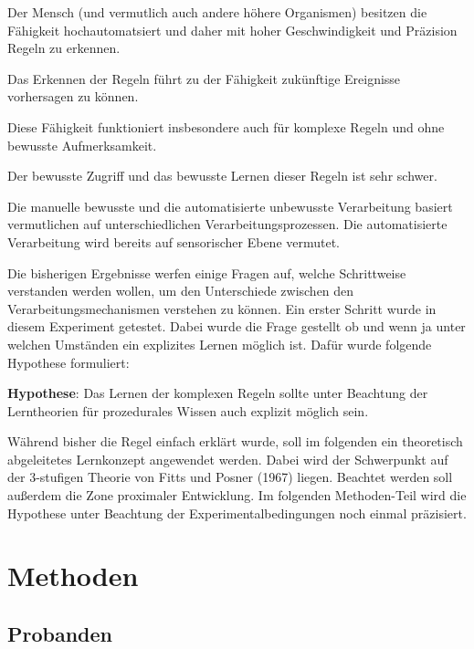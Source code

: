 \documentclass[doc,a4paper,12pt]{apa6}
\begin{document}
\begin{compactitem}
\item Der Mensch (und vermutlich auch andere höhere Organismen) besitzen die Fähigkeit hochautomatsiert und daher mit hoher Geschwindigkeit und Präzision Regeln zu erkennen.
\item Das Erkennen der Regeln führt zu der Fähigkeit zukünftige Ereignisse vorhersagen zu können.
\item Diese Fähigkeit funktioniert insbesondere auch für komplexe Regeln und ohne bewusste Aufmerksamkeit.
\item Der bewusste Zugriff und das bewusste Lernen dieser Regeln ist sehr schwer.
\item Die manuelle bewusste und die automatisierte unbewusste Verarbeitung basiert vermutlichen auf unterschiedlichen Verarbeitungsprozessen. Die automatisierte Verarbeitung wird bereits auf sensorischer Ebene vermutet.
\end{compactitem}

Die bisherigen Ergebnisse werfen einige Fragen auf, welche Schrittweise verstanden werden wollen, um den Unterschiede zwischen den Verarbeitungsmechanismen verstehen zu können. Ein erster Schritt wurde in diesem Experiment getestet. Dabei wurde die Frage gestellt ob und wenn ja unter welchen Umständen ein explizites Lernen möglich ist. Dafür wurde folgende Hypothese formuliert:

\textbf{Hypothese}: Das Lernen der komplexen Regeln sollte unter Beachtung der Lerntheorien für prozedurales Wissen auch explizit möglich sein.

Während bisher die Regel einfach erklärt wurde, soll im folgenden ein theoretisch abgeleitetes Lernkonzept angewendet werden. Dabei wird der Schwerpunkt auf der 3-stufigen Theorie von Fitts und Posner (1967) liegen. Beachtet werden soll außerdem die Zone proximaler Entwicklung. Im folgenden Methoden-Teil wird die Hypothese unter Beachtung der Experimentalbedingungen noch einmal präzisiert.


\section{Methoden}

\subsection{Probanden}
\end{document}
